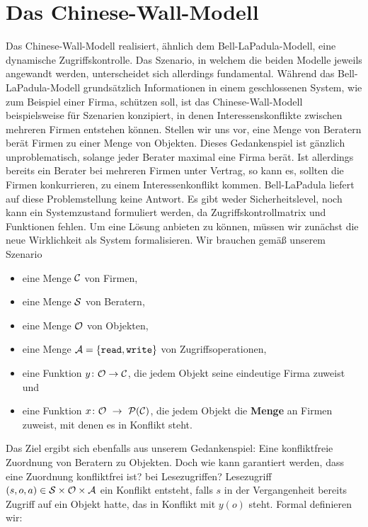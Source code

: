 \section{Das Chinese-Wall-Modell}\indexChineseWall
Das Chinese-Wall-Modell realisiert, ähnlich dem Bell-LaPadula-Modell,
eine dynamische Zugriffskontrolle. Das Szenario, in welchem die beiden
Modelle jeweils angewandt werden, unterscheidet sich allerdings
fundamental.  Während das Bell-LaPadula-Modell grundsätzlich
Informationen in einem geschlossenen System, wie zum Beispiel einer
Firma, schützen soll, ist das Chinese-Wall-Modell beispielsweise für
Szenarien konzipiert, in denen Interessenskonflikte zwischen mehreren
Firmen entstehen können.  Stellen wir uns vor, eine Menge von Beratern
berät Firmen zu einer Menge von Objekten. Dieses Gedankenspiel ist
gänzlich unproblematisch, solange jeder Berater maximal eine Firma
berät. Ist allerdings bereits ein Berater bei mehreren Firmen unter
Vertrag, so kann es, sollten die Firmen konkurrieren, zu einem
Interessenkonflikt kommen. Bell-LaPadula liefert auf diese
Problemstellung keine Antwort. Es gibt weder Sicherheitslevel, noch kann
ein Systemzustand formuliert werden, da Zugriffskontrollmatrix und
Funktionen fehlen.  Um eine Lösung anbieten zu können, müssen wir
zunächst die neue Wirklichkeit als System formalisieren. Wir brauchen
gemäß unserem Szenario

\begin{itemize}
\item eine Menge $\mathcal{C}$ von Firmen,
\item eine Menge $\mathcal{S}$ von Beratern,
\item eine Menge $\mathcal{O}$ von Objekten,
\item eine Menge $\mathcal{A} = \{\texttt{read}, \texttt{write}\}$ von Zugriffsoperationen, 
\item eine Funktion $y\colon \mathcal{O} \rightarrow \mathcal{C}$, die jedem Objekt seine eindeutige Firma zuweist und
\item eine Funktion $x\colon \calO\ \rArrow\ \calP(\calC)$, die jedem Objekt die \textbf{Menge} an Firmen zuweist, mit denen es in Konflikt steht.
\end{itemize}

Das Ziel ergibt sich ebenfalls aus unserem Gedankenspiel: Eine
konfliktfreie Zuordnung von Beratern zu Objekten. Doch wie kann
garantiert werden, dass eine Zuordnung konfliktfrei ist? %
bei Lesezugriffen? %
Lesezugriff $(s, o, a) \in \mathcal{S} \times \mathcal{O} \times \mathcal{A}$ ein Konflikt
entsteht, falls \(s\) in der Vergangenheit bereits Zugriff auf ein
Objekt hatte, das in Konflikt mit \(y(o)\) steht. Formal definieren wir:

